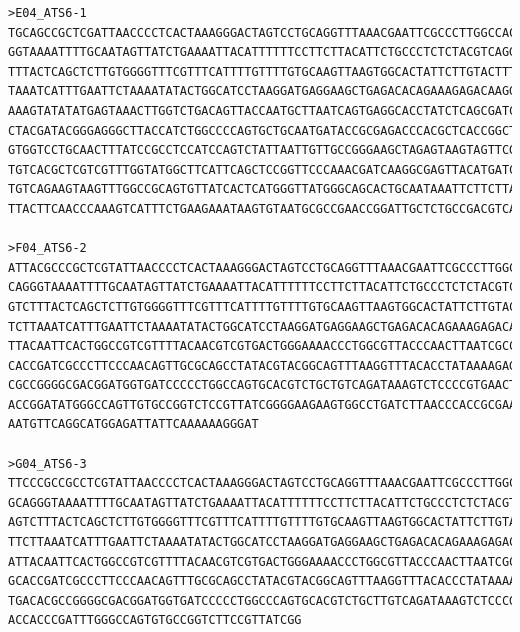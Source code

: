 \begin{verbatim}
>E04_ATS6-1
TGCAGCCGCTCGATTAACCCCTCACTAAAGGGACTAGTCCTGCAGGTTTAAACGAATTCGCCCTTGGCCACGCGTCGACTAGTACTTTTTTTTTTTTTTTTTCTTTTTTTAAGAAAGCAG
GGTAAAATTTTGCAATAGTTATCTGAAAATTACATTTTTTCCTTCTTACATTCTGCCCTCTCTACGTCAGGAATTAGATATTTTCATACTGCTTAGGGACGTAACTTACCAGTAATAGTC
TTTACTCAGCTCTTGTGGGGTTTCGTTTCATTTTGTTTTGTGCAAGTTAAGTGGCACTATTCTTGTACTTTTAATACTCACACTTCTATTTCCCCAAATAGTCTAAACACTTGTAATTCT
TAAATCATTTGAATTCTAAAATATACTGGCATCCTAAGGATGAGGAAGCTGAGACACAGAAAGAGACAAGGATCTTCACCTAGATCCTTTTAAATTAAAAATGAAGTTTTAAATCAATCT
AAAGTATATATGAGTAAACTTGGTCTGACAGTTACCAATGCTTAATCAGTGAGGCACCTATCTCAGCGATCTGTCTATTTCGTTCATCCATAGTTGCCTGACTCCCCGTCGTGTAGATAA
CTACGATACGGGAGGGCTTACCATCTGGCCCCAGTGCTGCAATGATACCGCGAGACCCACGCTCACCGGCTCCAGATTTATCAGCAATAAACCAGCCAGCCGGAAGGGCCGAGCGCAGAA
GTGGTCCTGCAACTTTATCCGCCTCCATCCAGTCTATTAATTGTTGCCGGGAAGCTAGAGTAAGTAGTTCGCCAGTTAATAGTTTGCGCAACGTTGTTGCCATTGCTACAGGCATCGTGG
TGTCACGCTCGTCGTTTGGTATGGCTTCATTCAGCTCCGGTTCCCAAACGATCAAGGCGAGTTACATGATCCCCCATGTTGTGCAAAAAAAGCGGTTAGCTCCTTCGGTCCTCCGATCGT
TGTCAGAAGTAAGTTTGGCCGCAGTGTTATCACTCATGGGTTATGGGCAGCACTGCAATAAATTCTTCTTAACTGTCATGCCCATCCCGTAAGAATGCTTTTTCTTGTGAACTGGTGAAG
TTACTTCAACCCAAAGTCATTTCTGAAGAAATAAGTGTAATGCGCCGAACCGGATTGCTCTGCCGACGTCAAATACGGAAATATAAATACACCGGCGGG

>F04_ATS6-2
ATTACGCCCGCTCGTATTAACCCCTCACTAAAGGGACTAGTCCTGCAGGTTTAAACGAATTCGCCCTTGGCCACGCGTCGACTAGTACTTTTTTTTTTTTTTTTTCTTTTTTTAAGAAAG
CAGGGTAAAATTTTGCAATAGTTATCTGAAAATTACATTTTTTCCTTCTTACATTCTGCCCTCTCTACGTCAGGAATTAGATATTTTCATACTGCTTAGGGACGTAACTTACCAGTAATA
GTCTTTACTCAGCTCTTGTGGGGTTTCGTTTCATTTTGTTTTGTGCAAGTTAAGTGGCACTATTCTTGTACTTTTAATACTCACACTTCTATTTCCCCAAATAGTCTAAACACTTGTAAT
TCTTAAATCATTTGAATTCTAAAATATACTGGCATCCTAAGGATGAGGAAGCTGAGACACAGAAAGAGACAAGGGCGAATTCGCGGCCGCTAAATTCAATTCGCCCTATAGTGAGTCGTA
TTACAATTCACTGGCCGTCGTTTTACAACGTCGTGACTGGGAAAACCCTGGCGTTACCCAACTTAATCGCCTTGCAGCACATCCCCCTTTCGCCAGCTGGCGTAATAGCGAAGAGGCCCG
CACCGATCGCCCTTCCCAACAGTTGCGCAGCCTATACGTACGGCAGTTTAAGGTTTACACCTATAAAAGAGAGAGCCGTTATCGTCTGTTTTGTGGATGTACAGAGTGATATTATTGACA
CGCCGGGGCGACGGATGGTGATCCCCCTGGCCAGTGCACGTCTGCTGTCAGATAAAGTCTCCCCGTGAACTTTACCCGGTGGTTGCATATCGGGGATGAAAAGCCTGGCGCATGATGACC
ACCGGATATGGGCCAGTTGTGCCGGTCTCCGTTATCGGGGAAGAAGTGGCCTGATCTTAACCCACCGCGAAAATGACATCAAAAAACGCCTTTAACCTTGATGTTTTTGGGGGAATTATA
AATGTTCAGGCATGGAGATTATTCAAAAAAGGGAT

>G04_ATS6-3
TTCCCGCCGCCTCGTATTAACCCCTCACTAAAGGGACTAGTCCTGCAGGTTTAAACGAATTCGCCCTTGGCCACGCGTCGACTAGTACTTTTTTTTTTTTTTTTTTCTTTTTTTAAGAAA
GCAGGGTAAAATTTTGCAATAGTTATCTGAAAATTACATTTTTTCCTTCTTACATTCTGCCCTCTCTACGTCAGGAATTAGATATTTTCATACTGCTTAGGGACGTAACTTACCAGTAAT
AGTCTTTACTCAGCTCTTGTGGGGTTTCGTTTCATTTTGTTTTGTGCAAGTTAAGTGGCACTATTCTTGTACTTTTAATACTCACACTTCTGTTTCCCCAAATAGTCTAAACACTTGTAA
TTCTTAAATCATTTGAATTCTAAAATATACTGGCATCCTAAGGATGAGGAAGCTGAGACACAGAAAGAGACAAGGGCGAATTCGCGGCCGCTAAATTCAATTCGCCCTATAGTGAGTCGT
ATTACAATTCACTGGCCGTCGTTTTACAACGTCGTGACTGGGAAAACCCTGGCGTTACCCAACTTAATCGCCTTGCAGCACATCCCCCTTTCGCCAGCTGGCGTAATAGCGAAGAGGCCC
GCACCGATCGCCCTTCCCAACAGTTTGCGCAGCCTATACGTACGGCAGTTTAAGGTTTACACCCTATAAAAGAGAGAGCCCGTTATCGTCTGTTTTGTGGATGTACAGAGTGATATTTAT
TGACACGCCGGGGCGACGGATGGTGATCCCCCTGGCCCAGTGCACGTCTGCTTGTCAGATAAAGTCTCCCGTGAACTTTACCCGGTGGTGCATATCGGGGATGAAAGCTGGCGCATGATG
ACCACCCGATTTGGGCCAGTGTGCCGGTCTTCCGTTATCGG


\end{verbatim}
